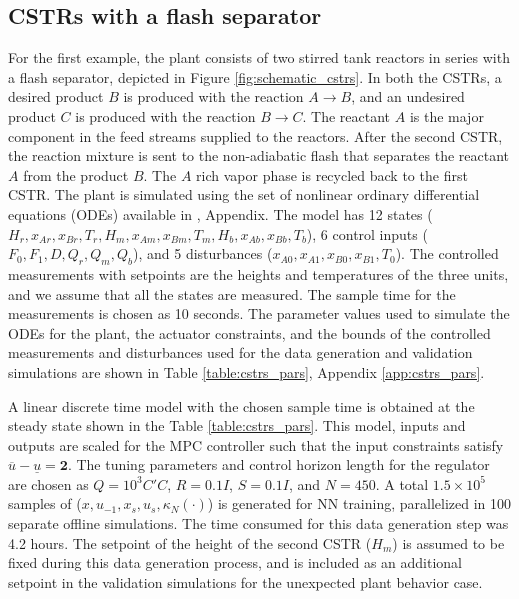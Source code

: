 \documentclass[preprint,5p, twocolumn, authoryear]{elsarticle}
\begin{document}
\subsection{CSTRs with a flash separator}

For the first example, the plant consists of two stirred tank reactors in series
with a flash separator, depicted in Figure \ref{fig:schematic_cstrs}. In both
the CSTRs, a desired product $B$ is produced with the reaction $A \rightarrow
B$, and an undesired product $C$ is produced with the reaction $B \rightarrow
C$. The reactant $A$ is the major component in the feed streams supplied to the
reactors. After the second CSTR, the reaction mixture is sent to the
non-adiabatic flash that separates the reactant $A$ from the product $B$. The
$A$ rich vapor phase is recycled back to the first CSTR. The plant is simulated
using the set of nonlinear ordinary differential equations (ODEs) available in
\cite{venkat:2006}, Appendix. The model has 12 states ($H_r, x_{Ar}, x_{Br},
T_r, H_m, x_{Am}, x_{Bm}, T_m, H_b, x_{Ab}, x_{Bb}, T_b$), 6 control inputs
($F_0, F_1, D, Q_r, Q_m, Q_b$), and 5 disturbances ($x_{A0}, x_{A1}, x_{B0},
x_{B1}, T_0$). The controlled measurements with setpoints are the heights and
temperatures of the three units, and we assume that all the states are measured.
The sample time for the measurements is chosen as 10 seconds. The parameter
values used to simulate the ODEs for the plant, the actuator constraints, and
the bounds of the controlled measurements and disturbances used for the data
generation and validation simulations are shown in Table \ref{table:cstrs_pars},
Appendix \ref{app:cstrs_pars}.

A linear discrete time model with the chosen sample time is obtained at the
steady state shown in the Table \ref{table:cstrs_pars}. This model, inputs and
outputs are scaled for the MPC controller such that the input constraints
satisfy $\overline{u} - \underline{u} = \mathbf{2}$. The tuning parameters and
control horizon length for the regulator are chosen as $Q = 10^3 C'C$, $R = 0.1
I$, $S = 0.1 I$, and $N = 450$. A total $1.5 \times 10^5$ samples of ($x,
u_{-1}, x_s, u_s, \kappa_N(\cdot)$) is generated for NN training, parallelized
in 100 separate offline simulations. The time consumed for this data generation
step was 4.2 hours. The setpoint of the height of the second CSTR ($H_m$) is
assumed to be fixed during this data generation process, and is included as an
additional setpoint in the validation simulations for the unexpected plant
behavior case.
\end{document}
